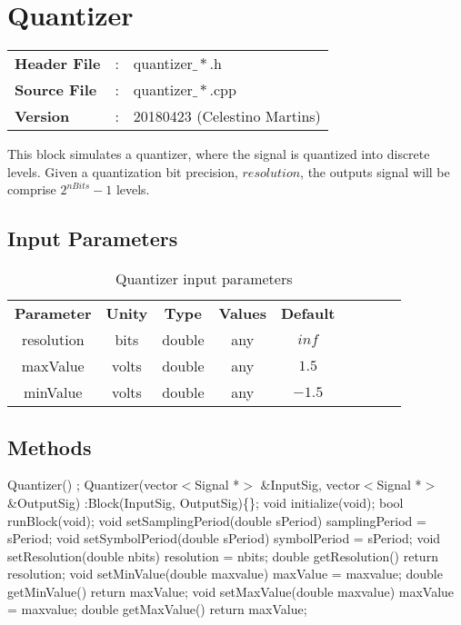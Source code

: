 \clearpage

\section{Quantizer}

\begin{tcolorbox}	
	\begin{tabular}{p{2.75cm} p{0.2cm} p{10.5cm}} 	
		\textbf{Header File}   &:& quantizer$\_*$.h \\
		\textbf{Source File}   &:& quantizer$\_*$.cpp \\
        \textbf{Version}       &:& 20180423 (Celestino Martins) \\
	\end{tabular}
\end{tcolorbox}

This block simulates a quantizer, where the signal is quantized into discrete levels. Given a quantization bit precision, $resolution$, the outputs signal will be comprise $2^{nBits}-1$ levels.

\subsection*{Input Parameters}

\begin{table}[h]
	\centering
	\begin{tabular}{|c|c|c|c|c|cccc}
		\cline{1-4}
		\textbf{Parameter} & \textbf{Unity} & \textbf{Type} & \textbf{Values} &   \textbf{Default}& \\ \cline{1-5}
		resolution & bits  & double & any & $inf$ \\ \cline{1-5}	
        maxValue   & volts & double & any & $1.5$ \\ \cline{1-5}	
        minValue   & volts & double & any    & $-1.5$ \\ \cline{1-5}	
	\end{tabular}
	\caption{Quantizer input parameters}
	\label{table:quantizer_in_par}
\end{table}


\subsection*{Methods}

Quantizer() {};
\bigbreak
Quantizer(vector$<$Signal *$>$ \&InputSig, vector$<$Signal *$>$ \&OutputSig) :Block(InputSig, OutputSig)\{\};
\bigbreak
void initialize(void);
\bigbreak
bool runBlock(void);
\bigbreak
void setSamplingPeriod(double sPeriod) { samplingPeriod = sPeriod; }
\bigbreak
void setSymbolPeriod(double sPeriod) { symbolPeriod = sPeriod; }
\bigbreak
void setResolution(double nbits) { resolution = nbits; }
\bigbreak
double getResolution() { return resolution; }
\bigbreak
void setMinValue(double maxvalue) { maxValue = maxvalue; }
\bigbreak
double getMinValue() { return maxValue; }
\bigbreak
void setMaxValue(double maxvalue) { maxValue = maxvalue; }
\bigbreak
double getMaxValue() { return maxValue; }

